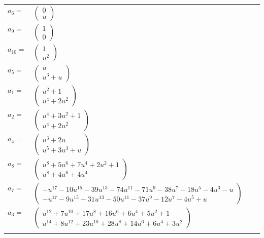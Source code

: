 \documentclass[1p]{elsarticle_modified}
\theoremstyle{definition}
\begin{document}
\begin{tabular}{m{7pt} m{180pt} m{7pt} m{180pt} }
\flushright $a_{6}=$&$\begin{pmatrix}0\\u\end{pmatrix}$ \\
\flushright $a_{9}=$&$\begin{pmatrix}1\\0\end{pmatrix}$ \\
\flushright $a_{10}=$&$\begin{pmatrix}1\\u^2\end{pmatrix}$ \\
\flushright $a_{5}=$&$\begin{pmatrix}u\\u^3+u\end{pmatrix}$ \\
\flushright $a_{1}=$&$\begin{pmatrix}u^2+1\\u^4+2 u^2\end{pmatrix}$ \\
\flushright $a_{2}=$&$\begin{pmatrix}u^4+3 u^2+1\\u^4+2 u^2\end{pmatrix}$ \\
\flushright $a_{4}=$&$\begin{pmatrix}u^3+2 u\\u^5+3 u^3+u\end{pmatrix}$ \\
\flushright $a_{8}=$&$\begin{pmatrix}u^8+5 u^6+7 u^4+2 u^2+1\\u^8+4 u^6+4 u^4\end{pmatrix}$ \\
\flushright $a_{7}=$&$\begin{pmatrix}- u^{17}-10 u^{15}-39 u^{13}-74 u^{11}-71 u^9-38 u^7-18 u^5-4 u^3- u\\- u^{17}-9 u^{15}-31 u^{13}-50 u^{11}-37 u^9-12 u^7-4 u^5+u\end{pmatrix}$ \\
\flushright $a_{3}=$&$\begin{pmatrix}u^{12}+7 u^{10}+17 u^8+16 u^6+6 u^4+5 u^2+1\\u^{14}+8 u^{12}+23 u^{10}+28 u^8+14 u^6+6 u^4+3 u^2\end{pmatrix}$\\&\end{tabular}
\end{document}
